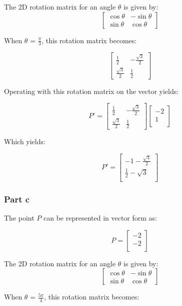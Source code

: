 \documentclass{article}
\begin{document}
The 2D rotation matrix for an angle $\theta$ is given by:
\[
\begin{bmatrix}
\cos \theta & -\sin \theta \\
\sin \theta & \cos \theta
\end{bmatrix}
\]


When $\theta$ = $\frac{\pi}{3}$, this rotation matrix becomes:

\[
\begin{bmatrix}
\frac{1}{2} & -\frac{\sqrt{3}}{2} \\
\frac{\sqrt{3}}{2} & \frac{1}{2}
\end{bmatrix}
\]

Operating with this rotation matrix on the vector yields:


\[P ' =
\begin{bmatrix}
\frac{1}{2} & -\frac{\sqrt{3}}{2} \\
\frac{\sqrt{3}}{2} & \frac{1}{2}
\end{bmatrix}
\left[ {\begin{array}{c}
    -2 \\
     1 \\
  \end{array} } \right]
\]

Which yields:

\[
  P'= 
  \left[ {\begin{array}{c}
    -1 - \frac{\sqrt{3}}{2} \\
    \frac{1}{2} - \sqrt{3} \\
  \end{array} } \right]
\]


\subsubsection*{Part c}

The point $P$ can be represented in vector form as: 

\[
  P= 
  \left[ {\begin{array}{c}
    -2 \\
    -2 \\
  \end{array} } \right]
\]

The 2D rotation matrix for an angle $\theta$ is given by:
\[
\begin{bmatrix}
\cos \theta & -\sin \theta \\
\sin \theta & \cos \theta
\end{bmatrix}
\]

When $\theta$ = $\frac{5\pi}{4}$, this rotation matrix becomes:
\end{document}
